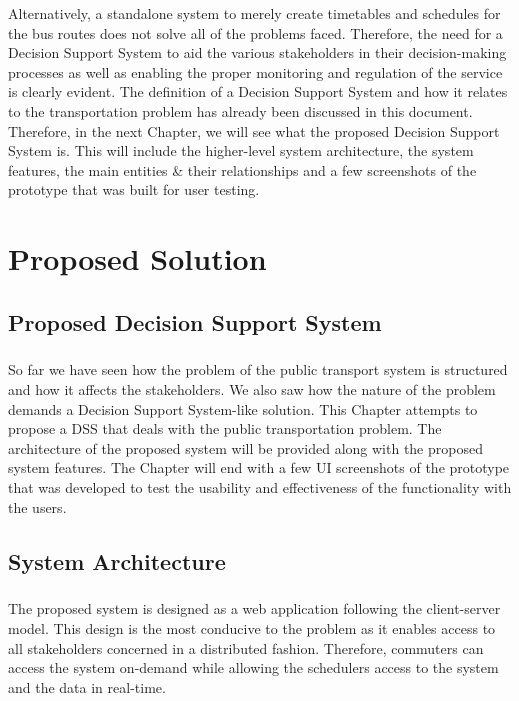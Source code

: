 \documentclass[12pt, oneside]{report}
\begin{document}
Alternatively, a standalone system to merely create timetables and schedules for the bus routes does not solve all of the problems faced. Therefore, the need for a Decision Support System to aid the various stakeholders in their decision-making processes as well as enabling the proper monitoring and regulation of the service is clearly evident. The definition of a Decision Support System and how it relates to the transportation problem has already been discussed in this document. Therefore, in the next Chapter, we will see what the proposed Decision Support System is. This will include the higher-level system architecture, the system features, the main entities \& their relationships and a few screenshots of the prototype that was built for user testing.

\newpage


\chapter {Proposed Solution}
\label{chapter-ProposedSolution}

\section *{Proposed Decision Support System}

\paragraph {} So far we have seen how the problem of the public transport system is structured and how it affects the stakeholders. We also saw how the nature of the problem demands a Decision Support System-like solution. This Chapter attempts to propose a DSS that deals with the public transportation problem. The architecture of the proposed system will be provided along with the proposed system features. The Chapter will end with a few UI screenshots of the prototype that was developed to test the usability and effectiveness of the functionality with the users.

\section{System Architecture}

\paragraph{ } The proposed system is designed as a web application following the client-server model. This design is the most conducive to the problem as it enables access to all stakeholders concerned in a distributed fashion. Therefore, commuters can access the system on-demand while allowing the schedulers access to the system and the data in real-time.
\end{document}
